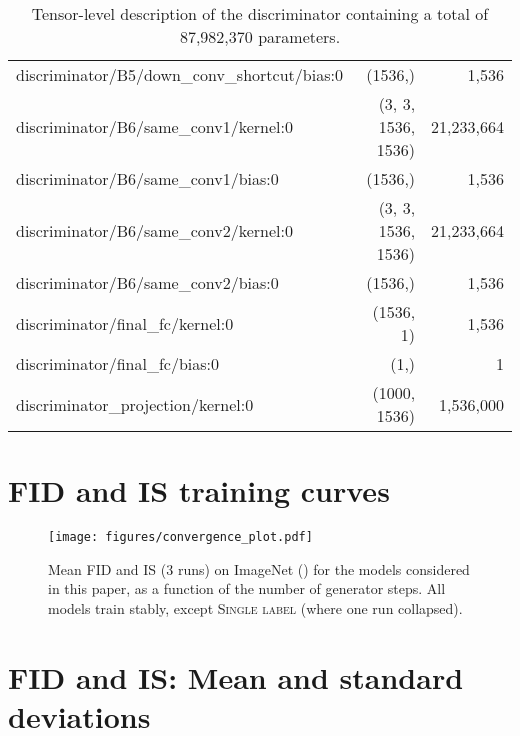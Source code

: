 \documentclass{article}
\newcommand{\slabels}{\textsc{Single label}}
\begin{document}
\begin{table*}[h]
{\begin{tabular}{lrr}
discriminator/B5/down\_conv\_shortcut/bias:0             & (1536,)&       1,536   \\
discriminator/B6/same\_conv1/kernel:0			& (3, 3, 1536, 1536)&  21,233,664   \\
discriminator/B6/same\_conv1/bias:0                      & (1536,)&       1,536   \\
discriminator/B6/same\_conv2/kernel:0			& (3, 3, 1536, 1536)&  21,233,664   \\
discriminator/B6/same\_conv2/bias:0                      & (1536,)&       1,536   \\
discriminator/final\_fc/kernel:0                         & (1536, 1)&       1,536   \\
discriminator/final\_fc/bias:0                           & (1,)&           1   \\
discriminator\_projection/kernel:0			& (1000, 1536)&   1,536,000   \\
\bottomrule
\end{tabular}     }
    \caption{Tensor-level description of the discriminator containing a total of 87,982,370 parameters.}
    \label{tab:discriminator_details}
\end{table*}

\FloatBarrier
\onecolumn
\section{FID and IS training curves}
\begin{figure*}[h!]
\centering
\texttt{[image: figures/convergence\_plot.pdf]}
\caption{Mean FID and IS (3 runs) on ImageNet () for the models considered in this paper, as a function of the number of generator steps. All models train stably, except \slabels{} (where one run collapsed). \label{fig:convergence}}
\end{figure*}

\FloatBarrier
\onecolumn
\section{FID and IS: Mean and standard deviations} \label{app:meanstd}
\end{document}
